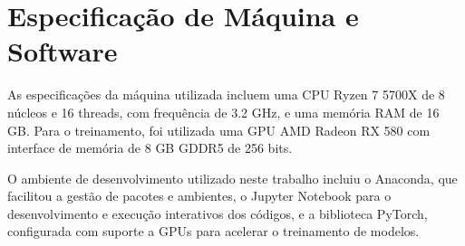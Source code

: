 \section{Especificação de Máquina e Software}
As especificações da máquina utilizada incluem uma CPU Ryzen 7 5700X de 8 núcleos e 16 threads, com frequência de 3.2 GHz, e uma memória RAM de 16 GB. Para o treinamento, foi utilizada uma GPU AMD Radeon RX 580 com interface de memória de 8 GB GDDR5 de 256 bits.

O ambiente de desenvolvimento utilizado neste trabalho incluiu o Anaconda, que facilitou a gestão de pacotes e ambientes, o Jupyter Notebook para o desenvolvimento e execução interativos dos códigos, e a biblioteca PyTorch, configurada com suporte a GPUs para acelerar o treinamento de modelos.






